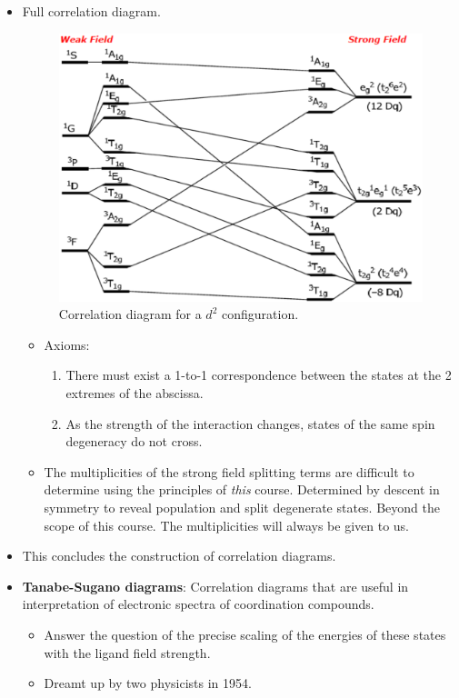 \documentclass[../notes.tex]{subfiles}
\begin{document}
\begin{itemize}
\begin{itemize}
    \end{itemize}
    \item Full correlation diagram.
    \begin{figure}[H]
        \centering
        \includegraphics[width=0.6\linewidth]{../ExtFiles/correlationDiagramd2.png}
        \caption{Correlation diagram for a $d^2$ configuration.}
        \label{fig:correlationDiagramd2}
    \end{figure}
    \begin{itemize}
        \item Axioms:
        \begin{enumerate}
            \item There must exist a 1-to-1 correspondence between the states at the 2 extremes of the abscissa.
            \item As the strength of the interaction changes, states of the same spin degeneracy do not cross.
        \end{enumerate}
        \item The multiplicities of the strong field splitting terms are difficult to determine using the principles of \emph{this} course. Determined by descent in symmetry to reveal population and split degenerate states. Beyond the scope of this course. The multiplicities will always be given to us.
    \end{itemize}
    \item This concludes the construction of correlation diagrams.
    \item \textbf{Tanabe-Sugano diagrams}: Correlation diagrams that are useful in interpretation of electronic spectra of coordination compounds.
    \begin{itemize}
        \item Answer the question of the precise scaling of the energies of these states with the ligand field strength.
        \item Dreamt up by two physicists in 1954.

\end{itemize}
\end{itemize}
\end{document}
